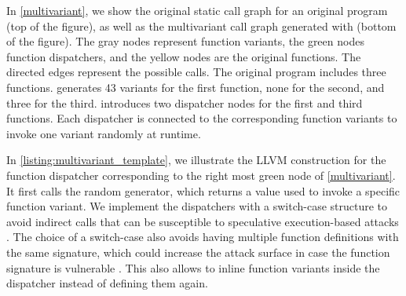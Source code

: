 In \autoref{multivariant}, we show the original static call graph for an original program (top of the figure), as well as the multivariant call graph generated with \tool (bottom of the figure).
The gray nodes represent function variants, the green nodes function dispatchers, and the yellow nodes are the original functions.
The directed edges represent the possible calls.
The original program includes three functions. \tool generates 43 variants for the first function, none for the second, and three for the third. 
\tool introduces two dispatcher nodes for the first and third functions. Each dispatcher is connected to the corresponding function variants to invoke one variant randomly at runtime.


In  \autoref{listing:multivariant_template}, we illustrate the LLVM construction for the function dispatcher corresponding to the right most green node of \autoref{multivariant}.
It first calls the random generator, which returns a value used to invoke a specific function variant. 
We implement the dispatchers with a switch-case structure to avoid indirect calls that can be susceptible to speculative execution-based attacks \cite{Narayan2021Swivel}. 
The choice of a switch-case also avoids having multiple function definitions with the same signature, which could increase the attack surface in case the function signature is vulnerable \cite{johnson2021}.
This also allows \tool to inline function variants inside the dispatcher instead of defining them again.


\lstset{
    language=llvm,
    basicstyle=\footnotesize\ttfamily,
    columns=fullflexible,
    breaklines=true,
    numbers=none,
    stepnumber=1,
    float
}

